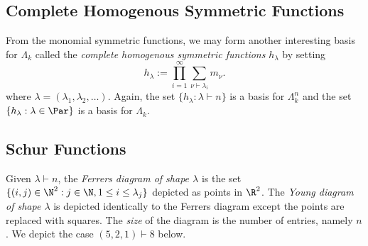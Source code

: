 \documentclass[12pt]{article}
\begin{document}
\subsection{Complete Homogenous Symmetric Functions}

From the monomial symmetric functions, we may form another interesting basis for $ \Lambda_{k} $ called the \textit{complete homogenous symmetric functions} $ h_{\lambda} $ by setting 
\[
  h_{\lambda}:=\prod_{i=1}^{\infty} \sum_{\nu\vdash \lambda_{i}} m_{\nu}.
\]
where $ \lambda = (\lambda_{1},\lambda_{2},\ldots) $. Again, the set $ \{h_{\lambda}: \lambda\vdash n\} $ is a basis for $ \Lambda_{k}^{n} $ and the set $ \{h_{\lambda}: \lambda\in\Par\} $ is a basis for $ \Lambda_{k} $.

\subsection{Schur Functions}

\begin{definition}\label{def:youngdiagram}
  Given $ \lambda\vdash n $, the \textit{Ferrers diagram of shape $ \lambda $} is the set $\{(i,j)\in \N^{2} : j\in \N, 1\leq i \leq \lambda_{j}\}$ depicted as points in $ \R^{2} $. The \textit{Young diagram of shape $ \lambda $} is depicted identically to the Ferrers diagram except the points are replaced with squares. The \textit{size} of the diagram is the number of entries, namely $ n $. We depict the case $ (5,2,1)\vdash 8 $ below.
\end{definition}
\end{document}
